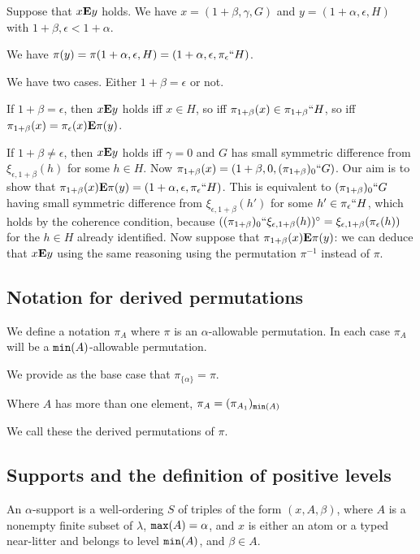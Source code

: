 \documentclass[12pt]{article}
\begin{document}
Suppose that $x {\bf E} y$ holds.  We have $x = (1+\beta,\gamma, G)$ and $y = (1+\alpha,\epsilon,H)$ with $1+\beta,\epsilon <1+\alpha$.

We have $\pi(y) = \pi(1+\alpha,\epsilon,H) = (1+\alpha,\epsilon,\pi_\epsilon``H)$.

We have two cases.  Either $1+\beta=\epsilon$ or not.

If $1+\beta=\epsilon$, then $x {\bf E} y$ holds iff $x \in H$, so iff $\pi_{1+\beta}(x) \in \pi_{1+\beta}``H$, so iff $\pi_{1+\beta}(x) = \pi_\epsilon(x) {\bf E} \pi(y)$.

If $1+\beta \neq \epsilon$, then $x {\bf E} y$ holds iff $\gamma=0$ and $G$ has small symmetric difference from $\xi_{\epsilon,1+\beta}(h)$ for some $h \in H$.  Now $\pi_{1+\beta}(x) = (1+\beta,0,(\pi_{1+\beta})_0``G)$.  Our aim is to show
that $\pi_{1+\beta}(x)  {\bf E} \pi(y) = (1+\alpha,\epsilon,\pi_{\epsilon}``H)$.  This is equivalent to $(\pi_{1+\beta})_0``G$ having small symmetric difference from $\xi_{\epsilon,1+\beta}(h')$ for some $h' \in \pi_{\epsilon}``H$, which holds by the coherence condition, because $((\pi_{1+\beta})_0``\xi_{\epsilon,1+\beta}(h))^{\circ}=\xi_{\epsilon,1+\beta}(\pi_\epsilon(h))$ for the $h \in H$ already identified.  Now suppose that $\pi_{1+\beta}(x) {\bf E} \pi(y)$:  we can deduce that $x {\bf E}y$ using the same reasoning using the permutation $\pi^{-1}$ instead of $\pi$.

\subsection{Notation for derived permutations}

We define a notation $\pi_A$ where $\pi$ is an $\alpha$-allowable permutation.  In each case $\pi_A$ will be a ${\tt min}(A)$-allowable permutation.

We provide as the base case that $\pi_{\{\alpha\}} = \pi$.

Where $A$ has more than one element, $\pi_A = (\pi_{A_1})_{{\tt min}(A)}$

We call these the derived permutations of $\pi$.

\subsection{Supports and the definition of positive levels}

An $\alpha$-support is a well-ordering $S$ of triples of the form $(x,A,\beta)$, where $A$ is a nonempty finite subset of $\lambda$,  ${\tt max}(A)=\alpha$, and $x$ is either an atom or a typed near-litter and belongs to level ${\tt min}(A)$, and $\beta\in A$.
\end{document}
